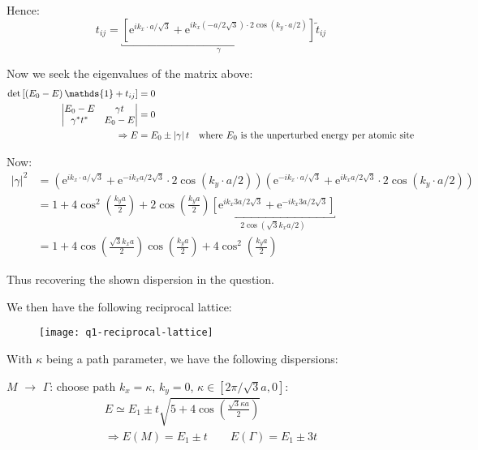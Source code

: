 \begin{parts}
	Hence:
	\begin{equation*}
		t_{ij} = \underbracket{\left[\mathrm{e}^{ik_x \cdot a/\sqrt{3}} + \mathrm{e}^{ik_x \left(-a/2\sqrt{3}\right) \cdot 2\cos\left(k_y \cdot a/2\right)}\right]}_{\gamma} \tilde{t}_{ij}
	\end{equation*}
	
	Now we seek the eigenvalues of the matrix above:
	\begin{align*}
		\textnormal{det}\left[\left(E_0 - E\right)\mathds{1} + t_{ij}\right] &= 0 \\
		\begin{vmatrix}
			E_0 - E & \gamma t \\
			\gamma^* t^* & E_0 - E
		\end{vmatrix} &= 0 \\
		\Rightarrow E &= E_0 \pm \left|\gamma\right| t \textnormal{\hspace{1em}where $E_0$ is the unperturbed energy per atomic site}
	\end{align*}
	
	Now:
	\begin{align*}
		\left|\gamma\right|^2 &= \left(\mathrm{e}^{ik_x \cdot a/\sqrt{3}} + \mathrm{e}^{-ik_x a/2\sqrt{3}} \cdot 2\cos\left(k_y \cdot a/2\right)\right) \left(\mathrm{e}^{-ik_x \cdot a/\sqrt{3}} + \mathrm{e}^{ik_x a/2\sqrt{3}} \cdot 2\cos\left(k_y \cdot a/2\right)\right) \\
		&= 1 + 4\cos^2 \left(\frac{k_y a}{2}\right) + 2\cos\left(\frac{k_y a}{2}\right) \underbracket{\left[\mathrm{e}^{ik_x 3a/2\sqrt{3}} + \mathrm{e}^{-ik_x 3a/2\sqrt{3}}\right]}_{2\cos\left(\sqrt{3}k_x a/2\right)} \\
		&= 1 + 4 \cos\left(\frac{\sqrt{3}k_x a}{2}\right) \cos\left(\frac{k_y a}{2}\right) + 4 \cos^2 \left(\frac{k_y a}{2}\right)
	\end{align*}
	
	Thus recovering the shown dispersion in the question.
	
	We then have the following reciprocal lattice:
	\begin{figure}[H]
		\centering
		\texttt{[image: q1-reciprocal-lattice]}
	\end{figure}
	
	With $\kappa$ being a path parameter, we have the following dispersions:
	
	$M$ $\rightarrow$ $\Gamma$: choose path $k_x = \kappa$, $k_y =0$, $\kappa\in\left[2\pi / \sqrt{3}a, 0\right]$:
	\begin{gather*}
		E \simeq E_1 \pm t \sqrt{5 + 4\cos \left(\frac{\sqrt{3}\kappa a}{2}\right)} \\
		\Rightarrow E(M) = E_1 \pm t \qquad E(\Gamma) = E_1 \pm 3t
	\end{gather*}
	

\end{parts}
